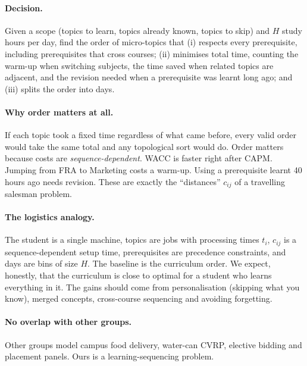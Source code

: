 \documentclass[11pt,a4paper]{article}
\begin{document}
\paragraph{Decision.} Given a scope (topics to learn, topics already known, topics to skip) and $H$ study hours per day, find the order of micro-topics that
(i) respects every prerequisite, including prerequisites that cross courses;
(ii) minimises total time, counting the warm-up when switching subjects, the time saved when related topics are adjacent, and the revision needed when a prerequisite was learnt long ago; and
(iii) splits the order into days.

\paragraph{Why order matters at all.} If each topic took a fixed time regardless of what came before, every valid order would take the same total and any topological sort would do. Order matters because costs are \emph{sequence-dependent}. WACC is faster right after CAPM. Jumping from FRA to Marketing costs a warm-up. Using a prerequisite learnt 40 hours ago needs revision. These are exactly the ``distances'' $c_{ij}$ of a travelling salesman problem.

\paragraph{The logistics analogy.} The student is a single machine, topics are jobs with processing times $t_i$, $c_{ij}$ is a sequence-dependent setup time, prerequisites are precedence constraints, and days are bins of size $H$. The baseline is the curriculum order. We expect, honestly, that the curriculum is close to optimal for a student who learns everything in it. The gains should come from personalisation (skipping what you know), merged concepts, cross-course sequencing and avoiding forgetting.

\paragraph{No overlap with other groups.} Other groups model campus food delivery, water-can CVRP, elective bidding and placement panels. Ours is a learning-sequencing problem.

\end{document}
